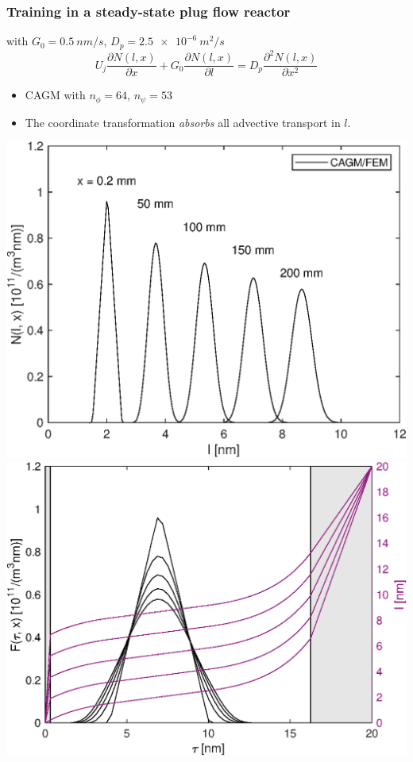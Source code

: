 \documentclass[10pt,xcolor=dvipsnames]{beamer}
\newcommand*{\itemskip}{0.25\baselineskip}
\begin{document}

\begin{frame}[t]
  
  \frametitle{Training in a steady-state plug flow reactor}
  
   with $G_0 = \SI{0.5}{nm/s}$, $D_p = \SI{2.5e-6}{m^2/s}$
  \begin{equation*}
    U_j \frac{\partial N(l, x)}{\partial x} + G_0 \frac{\partial N(l, x)}{\partial l}
    = D_p \frac{\partial^2 N(l, x)}{\partial x^2}
  \label{eq:plugflow}
  \end{equation*}
  
  \begin{itemize}
  \vspace{\itemskip}
  \item CAGM with $n_{\phi} = 64$, $n_{\psi} = 53$
  \vspace{\itemskip}
  \item The coordinate transformation \textit{absorbs} all advective transport in $l$.
  \vspace{\itemskip}
  \end{itemize}
  \includegraphics[height=0.38\columnwidth,clip]{fig/plugflow_N.eps}\hfill
  \includegraphics[height=0.38\columnwidth,clip]{fig/plugflow_Fl.eps}\\

\end{frame}
\end{document}
